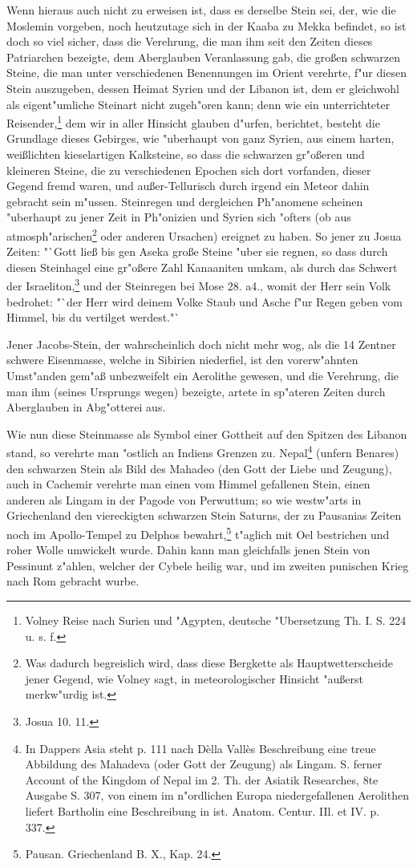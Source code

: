 \documentclass[a4paper, 11pt, oneside, polutonikogreek, german]{article}
\begin{document}
Wenn hieraus auch nicht zu erweisen ist, dass es derselbe Stein sei, der, wie die Moslemin vorgeben, noch heutzutage sich in der Kaaba zu Mekka befindet, so ist doch so viel sicher, dass die Verehrung, die man ihm seit den Zeiten dieses Patriarchen bezeigte, dem Aberglauben Veranlassung gab, die großen schwarzen Steine, die man unter verschiedenen Benennungen im Orient verehrte, f"ur diesen Stein auszugeben, dessen Heimat Syrien und der Libanon ist, dem er gleichwohl als eigent"umliche Steinart nicht zugeh"oren kann; denn wie ein unterrichteter Reisender,\footnote{Volney Reise nach Surien und "Agypten, deutsche "Ubersetzung Th. I. S. 224 u. s. f.} dem wir in aller Hinsicht glauben d"urfen, berichtet, besteht die Grundlage dieses Gebirges, wie "uberhaupt von ganz Syrien, aus einem harten, weißlichten kieselartigen Kalksteine, so dass die schwarzen gr"oßeren und kleineren Steine, die zu verschiedenen Epochen sich dort vorfanden, dieser Gegend fremd waren, und außer-Tellurisch durch irgend ein Meteor dahin gebracht sein m"ussen. Steinregen und dergleichen Ph"anomene scheinen "uberhaupt zu jener Zeit in Ph"onizien und Syrien sich "ofters (ob aus atmosph"arischen\footnote{Was dadurch begreislich wird, dass diese Bergkette als Hauptwetterscheide jener Gegend, wie Volney sagt, in meteorologischer Hinsicht "außerst merkw"urdig ist.} oder anderen Ursachen) ereignet zu haben. So jener zu Josua Zeiten: "`Gott ließ bis gen Aseka große Steine "uber sie regnen, so dass durch diesen Steinhagel eine gr"oßere Zahl Kanaaniten umkam, als durch das Schwert der Israeliton,\footnote{Josua 10. 11.} und der Steinregen bei Mose 28. a4., womit der Herr sein Volk bedrohet: "`der Herr wird deinem Volke Staub und Asche f"ur Regen geben vom Himmel, bis du vertilget werdest."`

Jener Jacobs-Stein, der wahrscheinlich doch nicht mehr wog, als die 14 Zentner schwere Eisenmasse, welche in Sibirien niederfiel, ist den vorerw"ahnten Umst"anden gem"aß unbezweifelt ein Aerolithe gewesen, und die Verehrung, die man ihm (seines Ursprungs wegen) bezeigte, artete in sp"ateren Zeiten durch Aberglauben in Abg"otterei aus.

Wie nun diese Steinmasse als Symbol einer Gottheit auf den Spitzen des Libanon stand, so verehrte man "ostlich an Indiens Grenzen zu. Nepal\footnote{In Dappers Asia steht p. 111 nach Dèlla Vallès Beschreibung eine treue Abbildung des Mahadeva (oder Gott der Zeugung) als Lingam. S. ferner Account of the Kingdom of Nepal im 2. Th. der Asiatik Researches, 8te Ausgabe S. 307, von einem im n"ordlichen Europa niedergefallenen Aerolithen liefert Bartholin eine Beschreibung in ist. Anatom. Centur. IIl. et IV. p. 337.} (unfern Benares) den schwarzen Stein als Bild des Mahadeo (den Gott der Liebe und Zeugung), auch in Cachemir verehrte man einen vom Himmel gefallenen Stein, einen anderen als Lingam in der Pagode von Perwuttum; so wie westw"arts in Griechenland den viereckigten schwarzen Stein Saturns, der zu Pausanias Zeiten noch im Apollo-Tempel zu Delphos bewahrt,\footnote{Pausan. Griechenland B. X., Kap. 24.} t"aglich mit Oel bestrichen und roher Wolle umwickelt wurde. Dahin kann man gleichfalls jenen Stein von Pessinunt z"ahlen, welcher der Cybele heilig war, und im zweiten punischen Krieg nach Rom gebracht wurbe.
\end{document}
